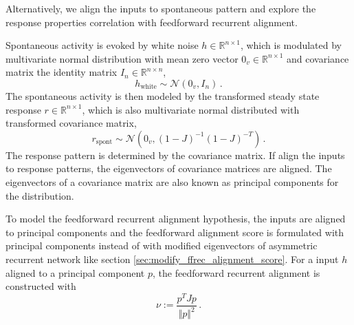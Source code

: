 \documentclass[11pt]{article}
\begin{document}
	Alternatively, we align the inputs to spontaneous pattern and explore the response properties correlation with feedforward recurrent alignment. 
		
	Spontaneous activity is evoked by white noise $h \in \mathbb{R}^{n \times 1}$, which is modulated by multivariate normal distribution with mean zero vector $0_v \in \mathbb{R}^{n \times 1}$ and covariance matrix the identity matrix $I_n \in \mathbb{R}^{n \times n}$, 
		\begin{equation}
			h_{\text{white}} \sim \mathcal{N}(0_v, I_n) \, .
		\end{equation}
	The spontaneous activity is then modeled by the transformed steady state response $r \in \mathbb{R}^{n \times 1}$, which is also multivariate normal distributed with transformed covariance matrix, 
		\begin{equation}
			r_{\text{spont}} \sim \mathcal{N}\left(0_v, (1-J)^{-1}(1-J)^{-T}\right) \, .
		\end{equation}
	The response pattern is determined by the covariance matrix. If align the inputs to response patterns, the eigenvectors of covariance matrices are aligned. The eigenvectors of a covariance matrix are also known as principal components for the distribution. 
	
	To model the feedforward recurrent alignment hypothesis, the inputs are aligned to principal components and the feedforward alignment score is formulated with principal components instead of with modified eigenvectors of asymmetric recurrent network like section \ref{sec:modify_ffrec_alignment_score}. For a input $h$ aligned to a principal component $p$, the feedforward recurrent alignment is constructed with 
		\begin{equation}
			\nu := \frac{p^T J p}{\Vert p \Vert^2} \, .
		\end{equation}
	
\end{document}
